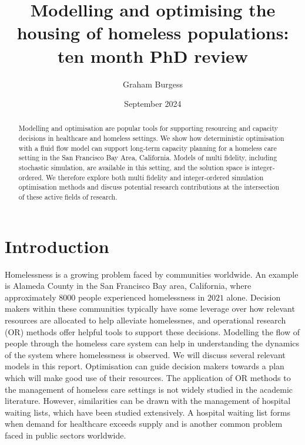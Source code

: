 \documentclass{article}
\title{Modelling and optimising the housing of homeless populations: ten month PhD review}
\author{Graham Burgess}
\date{September 2024}
\begin{document}
\maketitle

\begin{abstract}
Modelling and optimisation are popular tools for supporting resourcing and capacity decisions in healthcare and homeless settings. We show how deterministic optimisation with a fluid flow model can support long-term capacity planning for a homeless care setting in the San Francisco Bay Area, California. Models of multi fidelity, including stochastic simulation, are available in this setting, and the solution space is integer-ordered. We therefore explore both multi fidelity and integer-ordered simulation optimisation methods and discuss potential research contributions at the intersection of these active fields of research.
\end{abstract}

\section{Introduction}

Homelessness is a growing problem faced by communities worldwide. An example is Alameda County in the San Francisco Bay area, California, where approximately $8000$ people experienced homelessness in $2021$ alone. Decision makers within these communities typically have some leverage over how relevant resources are allocated to help alleviate homelessnes, and operational research (OR) methods offer helpful tools to support these decisions. Modelling the flow of people through the homeless care system can help in understanding the dynamics of the system where homelessness is observed. We will discuss several relevant models in this report. Optimisation can guide decision makers towards a plan which will make good use of their resources. The application of OR methods to the management of homeless care settings is not widely studied in the academic literature. However, similarities can be drawn with the management of hospital waiting lists, which have been studied extensively. A hospital waiting list forms when demand for healthcare exceeds supply and is another common problem faced in public sectors worldwide. \newline
\end{document}
